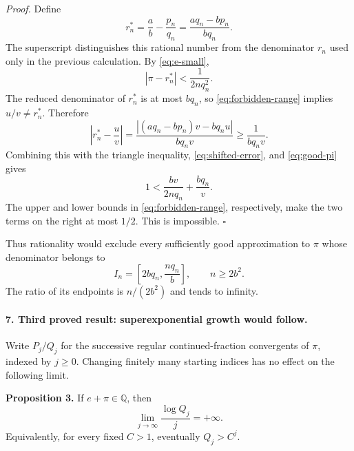 \documentclass[11pt]{article}
\newcommand{\Q}{\mathbb Q}
\begin{document}
\emph{Proof.} Define
\[
 r_n^{*}=\frac ab-\frac{p_n}{q_n}
 =\frac{aq_n-bp_n}{bq_n}.
\]
The superscript distinguishes this rational number from the denominator
$r_n$ used only in the previous calculation. By \eqref{eq:e-small},
\begin{equation}\label{eq:shifted-error}
 |\pi-r_n^{*}|<\frac1{2nq_n^2}.
\end{equation}
The reduced denominator of $r_n^{*}$ is at most $bq_n$, so
\eqref{eq:forbidden-range} implies $u/v\ne r_n^{*}$. Therefore
\[
 \left|r_n^{*}-\frac uv\right|
 =\frac{|(aq_n-bp_n)v-bq_nu|}{bq_nv}
 \ge\frac1{bq_nv}.
\]
Combining this with the triangle inequality, \eqref{eq:shifted-error},
and \eqref{eq:good-pi} gives
\[
 1<\frac{bv}{2nq_n}+\frac{bq_n}{v}.
\]
The upper and lower bounds in \eqref{eq:forbidden-range}, respectively,
make the two terms on the right at most $1/2$. This is impossible.
\hfill$\square$

Thus rationality would exclude every sufficiently good approximation to
$\pi$ whose denominator belongs to
\begin{equation}\label{eq:forbidden-interval}
 I_n=\left[2bq_n,\frac{nq_n}{b}\right],\qquad n\ge2b^2.
\end{equation}
The ratio of its endpoints is $n/(2b^2)$ and tends to infinity.

\paragraph{7. Third proved result: superexponential growth would follow.}
Write $P_j/Q_j$ for the successive regular continued-fraction convergents
of $\pi$, indexed by $j\ge0$. Changing finitely many starting indices has
no effect on the following limit.

\textbf{Proposition 3.} If $e+\pi\in\Q$, then
\begin{equation}\label{eq:superexponential}
 \boxed{\lim_{j\to\infty}\frac{\log Q_j}{j}=+\infty.}
\end{equation}
Equivalently, for every fixed $C>1$, eventually $Q_j>C^j$.
\end{document}
